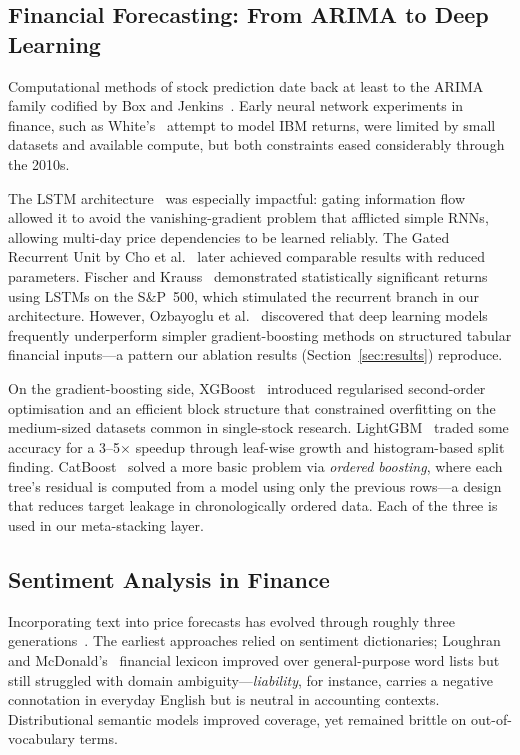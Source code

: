 \documentclass[10pt,a4paper,twoside]{article}
\begin{document}
\subsection{Financial Forecasting: From ARIMA to Deep Learning}

Computational methods of stock prediction date back at least to the ARIMA
family codified by Box and Jenkins~\cite{box2015}. Early neural network
experiments in finance, such as White's~\cite{white1988} attempt to model IBM
returns, were limited by small datasets and available compute, but both
constraints eased considerably through the 2010s.

The LSTM architecture~\cite{hochreiter1997} was especially impactful:
gating information flow allowed it to avoid the vanishing-gradient problem
that afflicted simple RNNs, allowing multi-day price dependencies to be learned
reliably. The Gated Recurrent Unit by Cho et al.~\cite{cho2014} later achieved
comparable results with reduced parameters. Fischer and Krauss~\cite{fischer2018}
demonstrated statistically significant returns using LSTMs on the S\&P~500,
which stimulated the recurrent branch in our architecture. However, Ozbayoglu et
al.~\cite{ozbayoglu2020} discovered that deep learning models frequently
underperform simpler gradient-boosting methods on structured tabular financial
inputs---a pattern our ablation results (Section~\ref{sec:results}) reproduce.

On the gradient-boosting side, XGBoost~\cite{chen2016} introduced regularised
second-order optimisation and an efficient block structure that constrained
overfitting on the medium-sized datasets common in single-stock research.
LightGBM~\cite{ke2017} traded some accuracy for a 3--5$\times$ speedup through
leaf-wise growth and histogram-based split finding. CatBoost~\cite{prokhorenkova2018}
solved a more basic problem via \emph{ordered boosting}, where each
tree's residual is computed from a model using only the previous rows---a
design that reduces target leakage in chronologically ordered data.
Each of the three is used in our meta-stacking layer.

\subsection{Sentiment Analysis in Finance}

Incorporating text into price forecasts has evolved through roughly three
generations~\cite{bollen2011}. The earliest approaches relied on sentiment
dictionaries; Loughran and McDonald's~\cite{loughran2011} financial lexicon
improved over general-purpose word lists but still struggled with domain
ambiguity---\emph{liability}, for instance, carries a negative connotation in
everyday English but is neutral in accounting contexts. Distributional semantic
models improved coverage, yet remained brittle on out-of-vocabulary terms.
\end{document}

